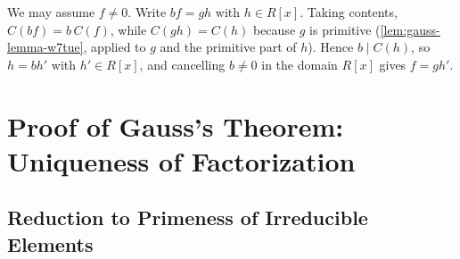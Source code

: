 
\begin{content}

\begin{steps}
We may assume $f \neq 0$. Write $b f = g h$ with $h \in R[x]$. Taking contents, $C(b f) = b \, C(f)$, while $C(g h) = C(h)$ because $g$ is primitive (\cref{lem:gauss-lemma-w7tue}, applied to $g$ and the primitive part of $h$). Hence $b \mid C(h)$, so $h = b h'$ with $h' \in R[x]$, and cancelling $b \neq 0$ in the domain $R[x]$ gives $f = g h'$.
\end{steps}
\end{content}

\section{Proof of Gauss's Theorem: Uniqueness of Factorization}

\subsection{Reduction to Primeness of Irreducible Elements}

